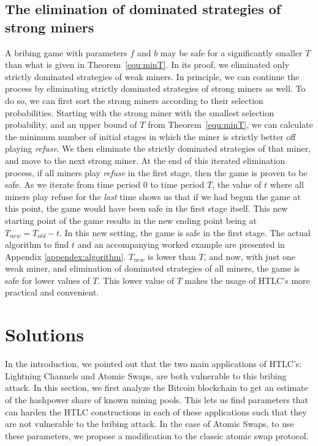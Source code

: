 \documentclass[runningheads]{llncs}
\newcommand{\refuse}{\emph{refuse}}
\begin{document}
\subsection{The elimination of dominated strategies of strong miners}
A bribing game with parameters $f$ and $b$ may be safe for a significantly smaller $T$ than what is given in Theorem~\ref{equ:minT}. In its proof, we eliminated only strictly dominated strategies of weak miners. In principle, we can continue the process by eliminating strictly dominated strategies of strong miners as well. To do so, we can first sort the strong miners according to their selection probabilities. Starting with the strong miner with the smallest selection probability, and an upper bound of $T$ from Theorem~\ref{equ:minT}, we can calculate the minimum number of initial stages in which the miner is strictly better off playing \refuse{}. We then eliminate the strictly dominated strategies of that miner, and move to the next strong miner. At the end of this iterated elimination process, if all miners play \refuse{} in the first stage, then the game is proven to be safe. As we iterate from time period 0 to time period $T$, the value of $t$ where all miners play refuse for the \textit{last} time shows us that if we had begun the game at this point, the game would have been safe in the first stage itself. This new starting point of the game results in the new ending point being at $T_{new} = T_{old} - t$. In this new setting, the game is safe in the first stage. The actual algorithm to find $t$ and an accompanying worked example are presented in Appendix \ref{appendex:algorithm}. $T_{new}$ is lower than $T$, and now, with just one weak miner, and elimination of dominated strategies of all miners, the game is safe for lower values of $T$. This lower value of $T$ makes the usage of HTLC's more practical and convenient. 

\section{Solutions}
\label{section:solutions}
In the introduction, we pointed out that the two main applications of HTLC's: Lightning Channels and Atomic Swaps, are both vulnerable to this bribing attack. In this section, we first analyze the Bitcoin blockchain to get an estimate of the hashpower share of known mining pools. This lets us find parameters that can harden the HTLC constructions in each of these applications such that they are not vulnerable to the bribing attack. In the case of Atomic Swaps, to use these parameters, we propose a modification to the classic atomic swap protocol.
\end{document}
